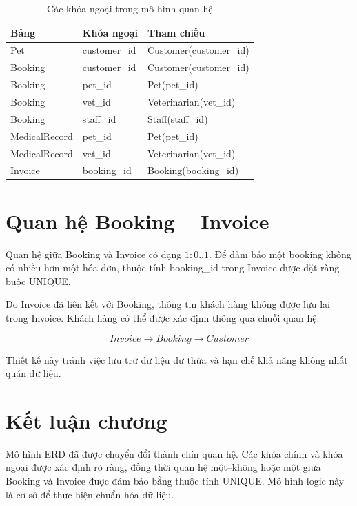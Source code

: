 \begin{table}[htbp]
    \centering
    \caption{Các khóa ngoại trong mô hình quan hệ}
    \label{tab:foreign_keys}
    \begin{tabularx}{1\textwidth}{|X|X|X|}
        \hline
        \textbf{Bảng} & \textbf{Khóa ngoại} & \textbf{Tham chiếu} \\ \hline
        Pet & customer\_id & Customer(customer\_id) \\ \hline
        Booking & customer\_id & Customer(customer\_id) \\ \hline
        Booking & pet\_id & Pet(pet\_id) \\ \hline
        Booking & vet\_id & Veterinarian(vet\_id) \\ \hline
        Booking & staff\_id & Staff(staff\_id) \\ \hline
        MedicalRecord & pet\_id & Pet(pet\_id) \\ \hline
        MedicalRecord & vet\_id & Veterinarian(vet\_id) \\ \hline
        Invoice & booking\_id & Booking(booking\_id) \\ \hline
    \end{tabularx}
\end{table}

\section{Quan hệ Booking -- Invoice}

Quan hệ giữa Booking và Invoice có dạng $1:0..1$. Để đảm bảo một booking không có nhiều hơn một hóa đơn, thuộc tính booking\_id trong Invoice được đặt ràng buộc UNIQUE.

Do Invoice đã liên kết với Booking, thông tin khách hàng không được lưu lại trong Invoice. Khách hàng có thể được xác định thông qua chuỗi quan hệ:

\[
Invoice \rightarrow Booking \rightarrow Customer
\]

Thiết kế này tránh việc lưu trữ dữ liệu dư thừa và hạn chế khả năng không nhất quán dữ liệu.

\section{Kết luận chương}

Mô hình ERD đã được chuyển đổi thành chín quan hệ. Các khóa chính và khóa ngoại được xác định rõ ràng, đồng thời quan hệ một--không hoặc một giữa Booking và Invoice được đảm bảo bằng thuộc tính UNIQUE. Mô hình logic này là cơ sở để thực hiện chuẩn hóa dữ liệu.